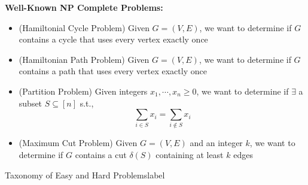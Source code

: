  	\begin{marginfigure}
 		\textbf{Well-Known NP Complete Problems:}
 		\begin{itemize}
 			\item (Hamiltonial Cycle Problem) Given $G = (V, E)$, we want to determine if $G$ contains a cycle that uses every vertex exactly once
 			\item (Hamiltonian Path Problem) Given $G = (V, E)$, we want to determine if $G$ contains a path that uses every vertex exactly once
 			\item (Partition Problem) Given integers $x_1, \cdots, x_n \geq 0$, we want to determine if $\exists$ a subset $S \subseteq [n]$ s.t.,
 			\[\sum_{i \in S} x_i = \sum_{i \not\in S} x_i\]
 			\item (Maximum Cut Problem) Given $G = (V, E)$ and an integer $k$, we want to determine if $G$ contains a cut $\delta(S)$  containing at least $k$ edges
 		\end{itemize}
 	\end{marginfigure}

 	\begin{ex}{Taxonomy of Easy and Hard Problems}{label}
 	\end{ex}

